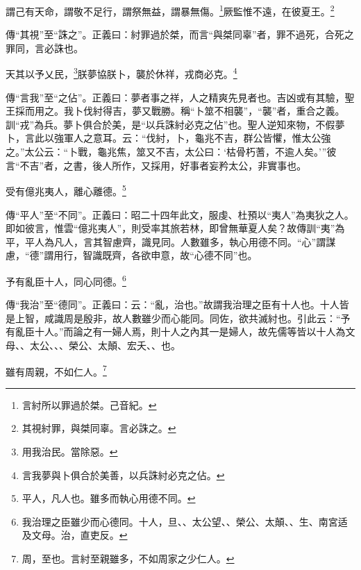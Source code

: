 謂己有天命，謂敬不足行，謂祭無益，謂暴無傷。\footnote{言紂所以罪過於桀。己音紀。}厥監惟不遠，在彼夏王。\footnote{其視紂罪，與桀同辜。言必誅之。}

{\noindent\zhuan{}\fzbyks 傳“其視”至“誅之”。正義曰：紂罪過於桀，而言“與桀同辜”者，罪不過死，合死之罪同，言必誅也。 \par}

天其以予乂民，\footnote{用我治民。當除惡。}朕夢協朕卜，襲於休祥，戎商必克。\footnote{言我夢與卜俱合於美善，以兵誅紂必克之佔。}

{\noindent\zhuan{}\fzbyks 傳“言我”至“之佔”。正義曰：夢者事之祥，人之精爽先見者也。吉凶或有其驗，聖王採而用之。我卜伐紂得吉，夢又戰勝。稱“卜筮不相襲”，“襲”者，重合之義。訓“戎”為兵。夢卜俱合於美，是“以兵誅紂必克之佔”也。聖人逆知來物，不假夢卜，言此以強軍人之意耳。云：“伐紂，卜，龜兆不吉，群公皆懼，惟太公強之。”太公云：“卜戰，龜兆焦，筮又不吉，太公曰：‘枯骨朽蓍，不逾人矣。’”彼言“不吉”者，之書，後人所作，又採用，好事者妄矜太公，非實事也。 \par}

受有億兆夷人，離心離德。\footnote{平人，凡人也。雖多而執心用德不同。}

{\noindent\zhuan{}\fzbyks 傳“平人”至“不同”。正義曰：昭二十四年此文，服虔、杜預以“夷人”為夷狄之人。即如彼言，惟雲“億兆夷人”，則受率其旅若林，即曾無華夏人矣？故傳訓“夷”為平，平人為凡人，言其智慮齊，識見同。人數雖多，執心用德不同。“心”謂謀慮，“德”謂用行，智識既齊，各欲申意，故“心德不同”也。 \par}

予有亂臣十人，同心同德。\footnote{我治理之臣雖少而心德同。十人，旦、、太公望、、榮公、太顛、、生、南宮适及文母。治，直吏反。}

{\noindent\zhuan{}\fzbyks 傳“我治”至“德同”。正義曰：云：“亂，治也。”故謂我治理之臣有十人也。十人皆是上智，咸識周是殷非，故人數雖少而心能同。同佐，欲共滅紂也。引此云：“予有亂臣十人。”而論之有一婦人焉，則十人之內其一是婦人，故先儒等皆以十人為文母、、太公、、、榮公、太顛、宏夭、、也。 \par}

雖有周親，不如仁人。\footnote{周，至也。言紂至親雖多，不如周家之少仁人。}

